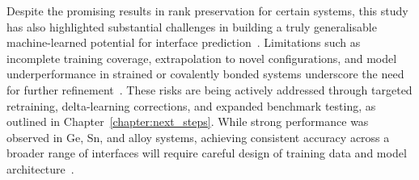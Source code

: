 Despite the promising results in rank preservation for certain systems, this study has also highlighted substantial challenges in building a truly generalisable machine-learned potential for interface prediction~\nocite{}.
Limitations such as incomplete training coverage, extrapolation to novel configurations, and model underperformance in strained or covalently bonded systems underscore the need for further refinement~\nocite{}.
These risks are being actively addressed through targeted retraining, delta-learning corrections, and expanded benchmark testing, as outlined in Chapter~\ref{chapter:next_steps}.
While strong performance was observed in Ge, Sn, and alloy systems, achieving consistent accuracy across a broader range of interfaces will require careful design of training data and model architecture~\nocite{}.